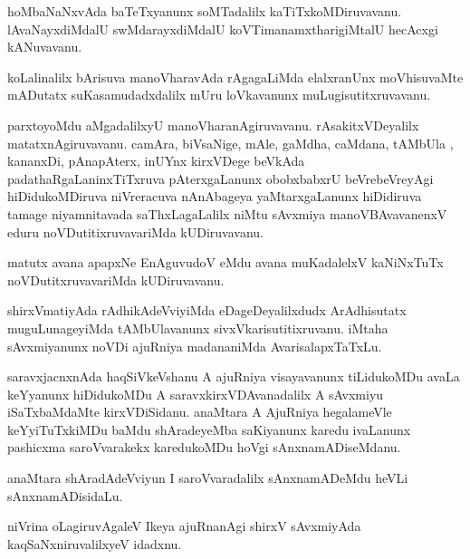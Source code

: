 \documentclass{article}
\begin{document}
\begin{mn}%
hoMbaNaNxvAda baTeTxyanunx soMTadalilx kaTiTxkoMDiruvavanu. lAvaNayxdiMdalU 
swMdarayxdiMdalU koVTimanamxtharigiMtalU hecAcxgi kANuvavanu.
\end{mn}

\begin{mn}%
koLalinalilx bArisuva manoVharavAda rAgagaLiMda elalxranUnx moVhisuvaMte mADutatx 
suKasamudadxdalilx mUru loVkavanunx muLugisutitxruvavanu.
\end{mn}

\begin{mn}%
parxtoyoMdu aMgadalilxyU manoVharanAgiruvavanu. rAsakitxVDeyalilx matatxnAgiruvavanu. 
camAra, biVsaNige, mAle, gaMdha, caMdana, tAMbUla , kananxDi, pAnapAterx, inUYnx kirxVDege 
beVkAda padathaRgaLaninxTiTxruva pAterxgaLanunx obobxbabxrU beVrebeVreyAgi hiDidukoMDiruva 
niVreracuva nAnAbageya yaMtarxgaLanunx hiDidiruva tamage niyamnitavada saThxLagaLalilx 
niMtu sAvxmiya manoVBAvavanenxV eduru noVDutitixruvavariMda kUDiruvavanu.
\end{mn}

\begin{mn}%
matutx avana apapxNe EnAguvudoV eMdu avana muKadalelxV kaNiNxTuTx noVDutitxruvavariMda 
kUDiruvavanu.
\end{mn}

\begin{mn}%
shirxVmatiyAda rAdhikAdeVviyiMda eDageDeyalilxdudx ArAdhisutatx muguLunageyiMda 
tAMbUlavanunx sivxVkarisutitixruvanu. iMtaha sAvxmiyanunx noVDi ajuRniya madananiMda 
AvarisalapxTaTxLu.
\end{mn}

\begin{mn}%
saravxjacnxnAda haqSiVkeVshanu A ajuRniya visayavanunx tiLidukoMDu avaLa keYyanunx 
hiDidukoMDu A saravxkirxVDAvanadalilx A sAvxmiyu iSaTxbaMdaMte kirxVDiSidanu. anaMtara A 
AjuRniya hegalameVle keYyiTuTxkiMDu baMdu shAradeyeMba saKiyanunx karedu ivaLanunx pashicxma
saroVvarakekx karedukoMDu hoVgi sAnxnamADiseMdanu.
\end{mn}

\begin{mn}%
anaMtara  shAradAdeVviyun I saroVvaradalilx sAnxnamADeMdu heVLi sAnxnamADisidaLu.
\end{mn}

\begin{mn}%
niVrina oLagiruvAgaleV Ikeya ajuRnanAgi shirxV sAvxmiyAda kaqSaNxniruvalilxyeV idadxnu.
\end{mn}
\end{document}
